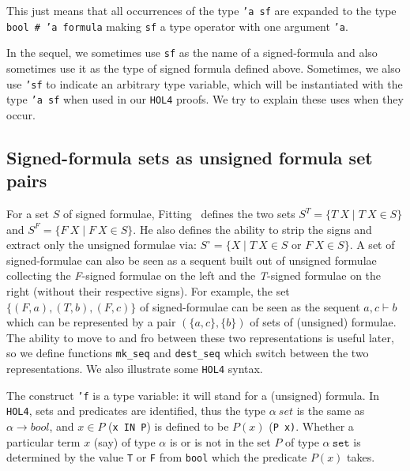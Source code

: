 \documentclass[a4paper]{article}
\newcommand{\hol}{\texttt{HOL4}}
\begin{document}
This just means that all occurrences of the type \texttt{'a sf} are
expanded to the type \texttt{bool \# 'a formula} making
\texttt{sf} a type operator with one argument \texttt{'a}.

In the sequel, we sometimes use \texttt{sf} as the name of a
signed-formula and also sometimes use it as the type of signed formula
defined above. Sometimes, we also use \texttt{'sf} to indicate an
arbitrary type variable, which will be instantiated with the type
\texttt{'a sf} when used in our \hol{} proofs. We try to explain these
uses when they occur.

\subsection{Signed-formula sets as unsigned formula set pairs}

For a set $S$ of signed formulae, 
Fitting~\cite[Definition~5]{fitting-dual-tableau} 
defines the two sets 
$S^T = \{T~X \mid T~X \in S \}$ 
and
$S^F = \{F~X \mid F~X \in S \}$.
He also defines the ability to strip the signs and extract only the
unsigned formulae via:
$S^\circ = \{X \mid T~X \in S \mbox{ or } F~X \in S \}$.
%
A set of signed-formulae can also be seen as a sequent built out of
unsigned formulae collecting the \textit{F}-signed formulae on the
left and the \textit{T}-signed formulae on the right (without their
respective signs). For example, the set $\{(F,a), (T,b), (F,c)\}$ of
signed-formulae can be seen as the sequent $a,c \vdash b$ which can be
represented by a pair $(\{a,c\}, \{b\})$ of sets of (unsigned)
formulae. The ability to move to and fro between these two
representations is useful later, so we define functions
\texttt{mk\_seq} and \texttt{dest\_seq} which switch between the two
representations.  We also illustrate some \hol{} syntax.

The construct \texttt{'f} is a type variable: it will stand for a
(unsigned) formula.
In \hol, sets and predicates are identified, thus
the type $\alpha\ \mathit{set}$ 
is the same as $\alpha \to \mathit{bool}$, and
$x \in P$ (\texttt{x IN P}) is defined to be $P(x)$ (\texttt{P x)}.
Whether a particular term $x$ (say) of type 
$\mathtt{\alpha}$ is or
is not in the set $P$ of type $\alpha\ \mathtt{set}$ is determined by the
value \texttt{T} or \texttt{F} from
\texttt{bool} which the predicate $P(x)$ takes.
\end{document}
